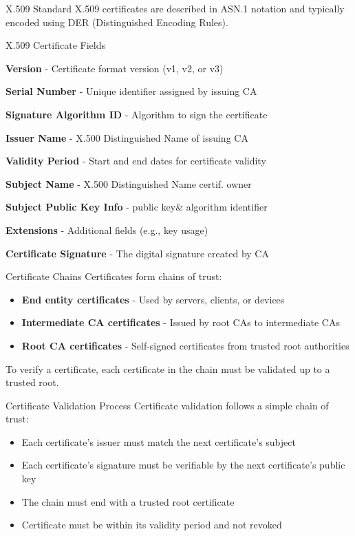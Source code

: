 \begin{definition}{X.509 Standard}
X.509 certificates are described in ASN.1 notation and typically encoded using DER (Distinguished Encoding Rules).
\end{definition}

\begin{concept}{X.509 Certificate Fields}

\textbf{Version} - Certificate format version (v1, v2, or v3)

\textbf{Serial Number} - Unique identifier assigned by issuing CA

\textbf{Signature Algorithm ID} - Algorithm to sign the certificate

\textbf{Issuer Name} - X.500 Distinguished Name of issuing CA

\textbf{Validity Period} - Start and end dates for certificate validity

\textbf{Subject Name} - X.500 Distinguished Name certif. owner

\textbf{Subject Public Key Info} - public key\& algorithm identifier

\textbf{Extensions} - Additional fields (e.g., key usage)

\textbf{Certificate Signature} - The digital signature created by CA

\end{concept}


\begin{definition}{Certificate Chains}
Certificates form chains of trust:
\begin{itemize}
    \item \textbf{End entity certificates} - Used by servers, clients, or devices
    \item \textbf{Intermediate CA certificates} - Issued by root CAs to intermediate CAs
    \item \textbf{Root CA certificates} - Self-signed certificates from trusted root authorities
\end{itemize}
To verify a certificate, each certificate in the chain must be validated up to a trusted root.
\end{definition}

\begin{concept}{Certificate Validation Process}
Certificate validation follows a simple chain of trust:
\begin{itemize}
    \item Each certificate's issuer must match the next certificate's subject
    \item Each certificate's signature must be verifiable by the next certificate's public key
    \item The chain must end with a trusted root certificate
    \item Certificate must be within its validity period and not revoked
\end{itemize}
\end{concept}

